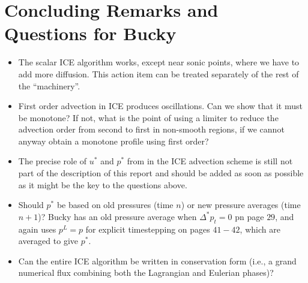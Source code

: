 \documentclass[11pt,oneside]{article}
\def \D {\Delta}
\begin{document}

\newpage
\section{Concluding Remarks and Questions for Bucky}
\begin{itemize}
\item The scalar ICE algorithm works, except near sonic points, where we
have to add more diffusion. This action item can be treated separately
of the rest of the ``machinery''.
\item First order advection in ICE produces oscillations. Can we show that
it must be monotone? If not, what is the point of using a limiter to reduce
the advection order from second to first in non-smooth regions, if we cannot
anyway obtain a monotone profile using first order?
\item The precise role of $u^*$ and $p^*$ from \cite[p.~29]{kashiwa2} in
the ICE advection scheme is still not part of the
description of this report and should be added as soon as possible as it
might be the key to the questions above.
\item Should $p^*$ be based on old pressures (time $n$) or new pressure
averages (time $n+1$)? Bucky has an old pressure average when $\D^* p_t = 0$
pn page $29$, and again uses $p^L = p$ for explicit timestepping on pages
$41-42$, which are averaged to give $p^*$.
\item Can the entire ICE algorithm be written in conservation form (i.e.,
a grand numerical flux combining both the Lagrangian and Eulerian phases)?
\end{itemize}


\end{document}
